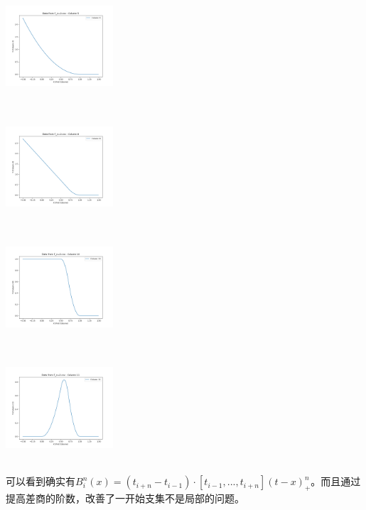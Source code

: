 \documentclass[UTF8]{ctexart}
\begin{document}
\noindent %
\begin{minipage}{0.23\textwidth}
	\includegraphics[width=4cm, height=4cm, keepaspectratio]{../figure/F_n=2.csv_Column_5.png} %
\end{minipage}
\hspace{0.5em} %
\begin{minipage}{0.23\textwidth}
	\includegraphics[width=4cm, height=4cm, keepaspectratio]{../figure/F_n=2.csv_Column_8.png} %
\end{minipage}
\hspace{0.5em} %
\begin{minipage}{0.23\textwidth}
	\includegraphics[width=4cm, height=4cm, keepaspectratio]{../figure/F_n=2.csv_Column_10.png} %
\end{minipage}
\hspace{0.5em} %
\begin{minipage}{0.23\textwidth}
	\includegraphics[width=4cm, height=4cm, keepaspectratio]{../figure/F_n=2.csv_Column_11.png} %
\end{minipage}

可以看到确实有$B_i^n(x) = (t_{i+n} − t_{i−1}) · [t_{i−1},..., t_{i+n}](t − x)^n_+$。而且通过提高差商的阶数，改善了一开始支集不是局部的问题。
\end{document}
